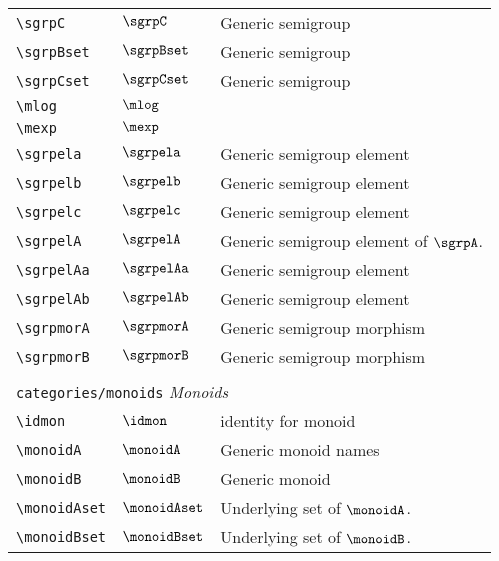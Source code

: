 \begin{longtable}{lll}
 {\color[rgb]{0.5,0.5,0.5}\texttt{\textbackslash sgrpC}} & $\sgrpC$ &  Generic semigroup\\ 
 {\color[rgb]{0.5,0.5,0.5}\texttt{\textbackslash sgrpBset}} & $\sgrpBset$ &  Generic semigroup\\ 
 {\color[rgb]{0.5,0.5,0.5}\texttt{\textbackslash sgrpCset}} & $\sgrpCset$ &  Generic semigroup\\ 
 {\color[rgb]{0.5,0.5,0.5}\texttt{\textbackslash mlog}} & $\mlog$ & \\ 
 {\color[rgb]{0.5,0.5,0.5}\texttt{\textbackslash mexp}} & $\mexp$ & \\ 
 {\color[rgb]{0.5,0.5,0.5}\texttt{\textbackslash sgrpela}} & $\sgrpela$ &  Generic semigroup element\\ 
 {\color[rgb]{0.5,0.5,0.5}\texttt{\textbackslash sgrpelb}} & $\sgrpelb$ &  Generic semigroup element\\ 
 {\color[rgb]{0.5,0.5,0.5}\texttt{\textbackslash sgrpelc}} & $\sgrpelc$ &  Generic semigroup element\\ 
 {\color[rgb]{0.5,0.5,0.5}\texttt{\textbackslash sgrpelA}} & $\sgrpelA$ &  Generic semigroup element of $\sgrpA$.\\ 
 {\color[rgb]{0.5,0.5,0.5}\texttt{\textbackslash sgrpelAa}} & $\sgrpelAa$ &  Generic semigroup element\\ 
 {\color[rgb]{0.5,0.5,0.5}\texttt{\textbackslash sgrpelAb}} & $\sgrpelAb$ &  Generic semigroup element\\ 
 {\color[rgb]{0.5,0.5,0.5}\texttt{\textbackslash sgrpmorA}} & $\sgrpmorA$ &  Generic semigroup morphism\\ 
 {\color[rgb]{0.5,0.5,0.5}\texttt{\textbackslash sgrpmorB}} & $\sgrpmorB$ &  Generic semigroup morphism\\ 
  &  & \\ 
 \multicolumn{3}{l}{{\color[rgb]{0.5,0.5,0.5}\texttt{categories/monoids}} \emph{Monoids}}\\ 
 \hline
{\color[rgb]{0.5,0.5,0.5}\texttt{\textbackslash idmon}} & $\idmon$ &  identity for monoid\\ 
 {\color[rgb]{0.5,0.5,0.5}\texttt{\textbackslash monoidA}} & $\monoidA$ &  Generic monoid names\\ 
 {\color[rgb]{0.5,0.5,0.5}\texttt{\textbackslash monoidB}} & $\monoidB$ &  Generic monoid\\ 
 {\color[rgb]{0.5,0.5,0.5}\texttt{\textbackslash monoidAset}} & $\monoidAset$ &  Underlying set of $\monoidA$.\\ 
 {\color[rgb]{0.5,0.5,0.5}\texttt{\textbackslash monoidBset}} & $\monoidBset$ &  Underlying set of $\monoidB$.\\ 

\end{longtable}
